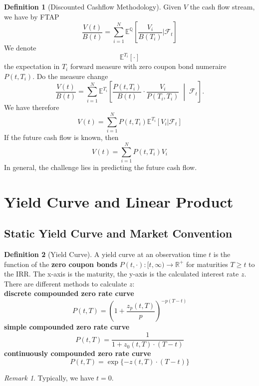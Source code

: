 \documentclass[a4paper,11pt]{book}
\theoremstyle{definition}
\newtheorem{definition}{Definition}[section]
\theoremstyle{remark}
\newtheorem*{remark}{Remark}
\begin{document}
\begin{definition}[Discounted Cashflow Methodology]
Given $V$ the cash flow stream, we have by FTAP
	\begin{equation*}
		\frac{V(t)}{B(t)} = \sum_{i = 1}^N \mathbb{E}^{\mathbb{Q}}\left[\frac{V_i}{B(T_i)}|\mathcal{F}_t\right] 
	\end{equation*}
	We denote 
	\[
	\mathbb{E}^{T_i}[ \cdot ]
	\]
	the expectation in $T_i$ forward measure with zero coupon bond numeraire $P(t, T_i)$. Do the measure change
	\[
\frac{V(t)}{B(t)} = \sum_{i=1}^{N} \mathbb{E}^{T_i} \left[ \frac{P(t, T_i)}{B(t)} \cdot \frac{V_i}{P(T_i, T_i)} \;\middle|\; \mathcal{F}_t \right].
\]
We have therefore
	\begin{equation*}
		V(t) = \sum^N_{i = 1}P(t, T_i) \mathbb{E}^{T_i}[V_i|\mathcal{F}_t]
	\end{equation*}
	If the future cash flow is known, then
	\begin{equation*}
		V(t) = \sum^N_{i = 1}P(t, T_i) V_i
	\end{equation*}
	In general, the challenge lies in predicting the future cash flow.
\end{definition}



\section{Yield Curve and Linear Product}
\subsection{Static Yield Curve and Market Convention}

\begin{definition}[Yield Curve]	
A yield curve at an observation time $t$ is the function of the \textbf{zero coupon bonds} $P(t, \cdot): [t, \infty) \rightarrow \mathbb{R}^+$ for maturities $T \geq t$ to the IRR. The x-axis is the maturity, the y-axis is the calculated interest rate $z$. There are different methods to calculate $z$:  \\
\textbf{discrete compounded zero rate curve}
\begin{equation*}
	P(t, T) = ( 1 + \frac{z_p(t, T)}{p})^{-p(T-t)}
\end{equation*}
\textbf{simple compounded zero rate curve}
\begin{equation*}
	P(t, T) = \frac{1}{1 + z_0(t, T)\cdot(T - t)}
\end{equation*}
\textbf{continuously compounded zero rate curve}
\begin{equation*}
	P(t, T) = \exp\{ - z(t, T) \cdot (T - t) \}
\end{equation*}
\end{definition}
\begin{remark}
Typically, we have $t = 0$. 	
\end{remark}
\end{document}

